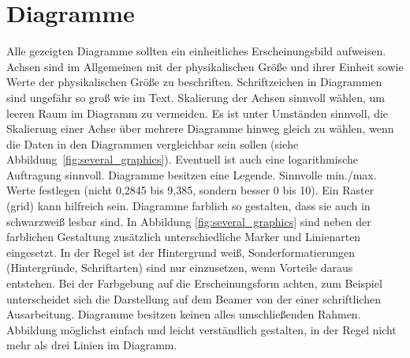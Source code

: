 \newpage

\section{Diagramme}
\label{SECTION:Diagramme}

Alle gezeigten Diagramme sollten ein einheitliches Erscheinungsbild aufweisen. Achsen sind im Allgemeinen mit der physikalischen Größe und ihrer Einheit sowie Werte der physikalischen Größe zu beschriften. Schriftzeichen in Diagrammen sind ungefähr so groß wie im Text. Skalierung der Achsen sinnvoll wählen, um leeren Raum im Diagramm zu vermeiden. Es ist unter Umständen sinnvoll, die Skalierung einer Achse über mehrere Diagramme hinweg gleich zu wählen, wenn die Daten in den Diagrammen vergleichbar sein sollen (siehe Abbildung~\ref{fig:several_graphics}). Eventuell ist auch eine logarithmische Auftragung sinnvoll. Diagramme besitzen eine Legende. Sinnvolle min./max. Werte festlegen (nicht 0,2845 bis 9,385, sondern besser 0 bis 10). Ein Raster (\glqq grid\grqq) kann hilfreich sein. Diagramme farblich so gestalten, dass sie auch in schwarzweiß lesbar sind. In Abbildung \ref{fig:several_graphics} sind neben der farblichen Gestaltung zusätzlich unterschiedliche Marker und Linienarten eingesetzt. In der Regel ist der Hintergrund weiß, Sonderformatierungen (Hintergründe, Schriftarten) sind nur einzusetzen, wenn Vorteile daraus entstehen. Bei der Farbgebung auf die Erscheinungsform achten, zum Beispiel unterscheidet sich die Darstellung auf dem Beamer von der einer schriftlichen Ausarbeitung. Diagramme besitzen keinen alles umschließenden Rahmen. Abbildung möglichst einfach und leicht verständlich gestalten, in der Regel nicht mehr als drei Linien im Diagramm.

